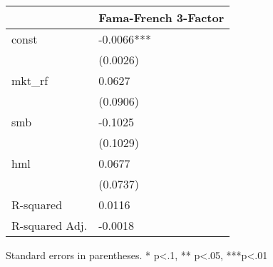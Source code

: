 \begin{table}
\caption{}
\label{}
\begin{center}
\begin{tabular}{ll}
\hline
               & Fama-French 3-Factor  \\
\hline
const          & -0.0066***            \\
               & (0.0026)              \\
mkt\_rf        & 0.0627                \\
               & (0.0906)              \\
smb            & -0.1025               \\
               & (0.1029)              \\
hml            & 0.0677                \\
               & (0.0737)              \\
R-squared      & 0.0116                \\
R-squared Adj. & -0.0018               \\
\hline
\end{tabular}
\end{center}
\end{table}
\bigskip
Standard errors in parentheses. \newline 
* p<.1, ** p<.05, ***p<.01